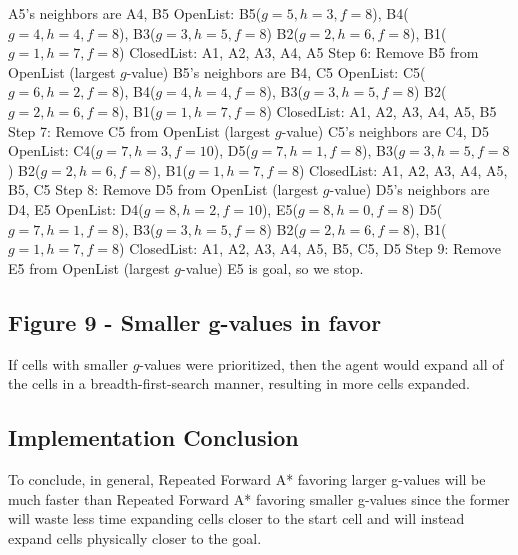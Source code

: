 \documentclass[10pt,a4paper]{article}
\begin{document}
A5's neighbors are A4, B5\newline
OpenList: B5($g = 5, h = 3, f = 8$), B4($g = 4, h = 4, f = 8$), B3($g = 3, h = 5, f = 8$) B2($g = 2, h = 6, f = 8$), B1($g = 1, h = 7, f = 8$)\newline
ClosedList: A1, A2, A3, A4, A5
\newline\newline
Step 6:\newline
Remove B5 from OpenList (largest $g$-value)\newline
B5's neighbors are B4, C5
OpenList: C5($g = 6, h = 2, f = 8$), B4($g = 4, h = 4, f = 8$), B3($g = 3, h = 5, f = 8$) B2($g = 2, h = 6, f = 8$), B1($g = 1, h = 7, f = 8$)\newline
ClosedList: A1, A2, A3, A4, A5, B5
\newline\newline
Step 7:\newline
Remove C5 from OpenList (largest $g$-value)\newline
C5's neighbors are C4, D5
OpenList: C4($g = 7, h = 3, f = 10$), D5($g = 7, h = 1, f = 8$), B3($g = 3, h = 5, f = 8$) B2($g = 2, h = 6, f = 8$), B1($g = 1, h = 7, f = 8$)\newline
ClosedList: A1, A2, A3, A4, A5, B5, C5
\newline\newline
Step 8:\newline
Remove D5 from OpenList (largest $g$-value)\newline
D5's neighbors are D4, E5
OpenList: D4($g = 8, h = 2, f = 10$), E5($g = 8, h = 0, f = 8$) D5($g = 7, h = 1, f = 8$), B3($g = 3, h = 5, f = 8$) B2($g = 2, h = 6, f = 8$), B1($g = 1, h = 7, f = 8$)\newline
ClosedList: A1, A2, A3, A4, A5, B5, C5, D5
\newline\newline
Step 9:\newline
Remove E5 from OpenList (largest $g$-value)\newline
E5 is goal, so we stop.
\subsection*{Figure 9 - Smaller g-values in favor}
If cells with smaller $g$-values were prioritized, then the agent would expand all of the cells in a breadth-first-search manner, resulting in more cells expanded.
\subsection*{Implementation Conclusion}
To conclude, in general, Repeated Forward A* favoring larger g-values will be much faster than Repeated Forward A* favoring smaller g-values since the former will waste less time expanding cells closer to the start cell and will instead expand cells physically closer to the goal.
\end{document}
